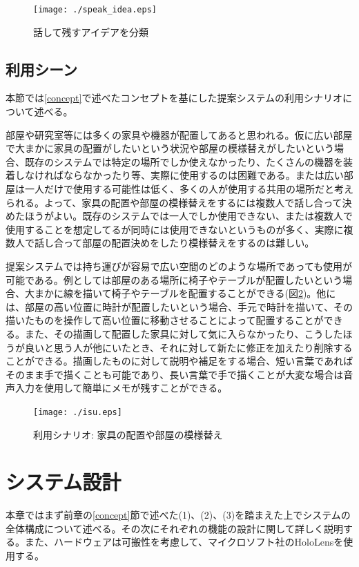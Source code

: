 \documentclass[11pt,a4j, titlepage]{jarticle} %
\begin{document}
\begin{figure}[H]
  \begin{center}
    \texttt{[image: ./speak\_idea.eps]}
    \caption{話して残すアイデアを分類}
    \label{fig:speak_idea}
  \end{center}
\end{figure}

\subsection{利用シーン}
本節では\ref{concept}で述べたコンセプトを基にした提案システムの利用シナリオについて述べる。

部屋や研究室等には多くの家具や機器が配置してあると思われる。仮に広い部屋で大まかに家具の配置がしたいという状況や部屋の模様替えがしたいという場合、既存のシステムでは特定の場所でしか使えなかったり、たくさんの機器を装着しなければならなかったり等、実際に使用するのは困難である。または広い部屋は一人だけで使用する可能性は低く、多くの人が使用する共用の場所だと考えられる。よって、家具の配置や部屋の模様替えをするには複数人で話し合って決めたほうがよい。既存のシステムでは一人でしか使用できない、または複数人で使用することを想定してるが同時には使用できないというものが多く、実際に複数人で話し合って部屋の配置決めをしたり模様替えをするのは難しい。

提案システムでは持ち運びが容易で広い空間のどのような場所であっても使用が可能である。例としては部屋のある場所に椅子やテーブルが配置したいという場合、大まかに線を描いて椅子やテーブルを配置することができる(図\ref{fig:isu})。他には、部屋の高い位置に時計が配置したいという場合、手元で時計を描いて、その描いたものを操作して高い位置に移動させることによって配置することができる。また、その描画して配置した家具に対して気に入らなかったり、こうしたほうが良いと思う人が他にいたとき、それに対して新たに修正を加えたり削除することができる。描画したものに対して説明や補足をする場合、短い言葉であればそのまま手で描くことも可能であり、長い言葉で手で描くことが大変な場合は音声入力を使用して簡単にメモが残すことができる。

\begin{figure}[H]
  \begin{center}
    \texttt{[image: ./isu.eps]}
    \caption{利用シナリオ: 家具の配置や部屋の模様替え}
    \label{fig:isu}
  \end{center}
\end{figure}

\newpage
\section{システム設計}
本章ではまず前章の\ref{concept}節で述べた(1)、(2)、(3)を踏まえた上でシステムの全体構成について述べる。その次にそれぞれの機能の設計に関して詳しく説明する。また、ハードウェアは可搬性を考慮して、マイクロソフト社のHoloLens\cite{hololens}を使用する。
\end{document}
